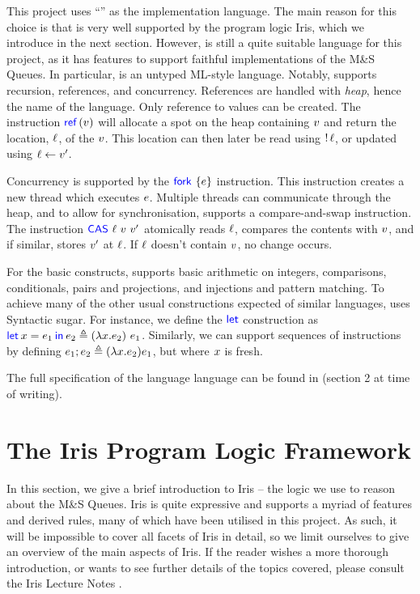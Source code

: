 \documentclass[a4paper, 10pt]{report}
\theoremstyle{definition}
\newcommand{\msq}{M\&S Queue}
\begin{document}
This project uses ``\heaplang'' as the implementation language. The main reason for this choice is that \heaplang is very well supported by the program logic Iris, which we introduce in the next section. However, \heaplang is still a quite suitable language for this project, as it has features to support faithful implementations of the \msq{}s. In particular, \heaplang is an untyped ML-style language. Notably, \heaplang supports recursion, references, and concurrency. References are handled with \textit{heap}, hence the name of the language. Only reference to values can be created. The instruction $\Ref(\val)$ will allocate a spot on the heap containing $v$ and return the location, $\ell$, of the $v$. This location can then later be read using $\mathop{!} \ell$, or updated using $\ell \leftarrow v'$.

Concurrency is supported by the $\Fork{\expr}$ instruction. This instruction creates a new thread which executes $e$. Multiple threads can communicate through the heap, and to allow for synchronisation, \heaplang supports a compare-and-swap instruction. The instruction $\textsf{\color{blue} CAS} \ \ell \ v \ v'$ atomically reads $\ell$, compares the contents with $v$, and if similar, stores $v'$ at $\ell$. If $\ell$ doesn't contain $v$, no change occurs.

For the basic constructs, \heaplang supports basic arithmetic on integers, comparisons, conditionals, pairs and projections, and injections and pattern matching. To achieve many of the other usual constructions expected of similar languages, \heaplang uses Syntactic sugar. For instance, we define the $\textsf{\color{blue} let}$ construction as $\Let \var = \expr_1 in \expr_2 \eqdef (\lambda{} \var . \expr_2) ~ \expr_1$. Similarly, we can support sequences of instructions by defining $e_1 ; e_2 \triangleq (\lambda{} x . e_2) e_1$, but where $x$ is fresh.

The full specification of the language language can be found in \citet{gentleiris} (section 2 at time of writing).

\section{The Iris Program Logic Framework}
\label{Pre:section:iris}

In this section, we give a brief introduction to Iris -- the logic we use to reason about the \msq{}s. Iris is quite expressive and supports a myriad of features and derived rules, many of which have been utilised in this project. As such, it will be impossible to cover all facets of Iris in detail, so we limit ourselves to give an overview of the main aspects of Iris. If the reader wishes a more thorough introduction, or wants to see further details of the topics covered, please consult the Iris Lecture Notes \citep{gentleiris}.
\end{document}
